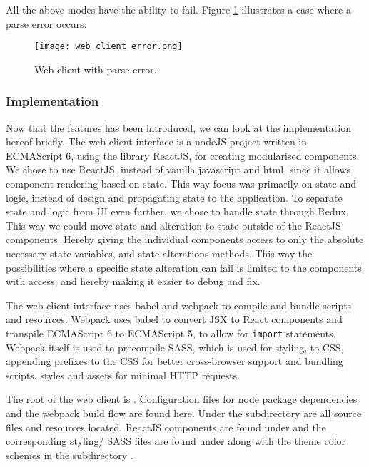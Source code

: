 All the above modes have the ability to fail. Figure \ref{fig:web_client_error} illustrates a case where a parse error occurs.

\begin{figure}
  \texttt{[image: web\_client\_error.png]}
  \caption{Web client with parse error.}
  \label{fig:web_client_error}
\end{figure}


\subsubsection{Implementation}

Now that the features has been introduced, we can look at the implementation hereof briefly.
The web client interface is a nodeJS project written in ECMAScript 6, using the library ReactJS, for creating modularised components.
We chose to use ReactJS, instead of vanilla javascript and html, since it allows component rendering based on state.
This way focus was primarily on state and logic, instead of design and propagating state to the application.
To separate state and logic from UI even further, we chose to handle state through Redux.
This way we could move state and alteration to state outside of the ReactJS components. Hereby giving the individual components access to only the absolute necessary state variables, and state alterations methods.
This way the possibilities where a specific state alteration can fail is limited to the components with access, and hereby making it easier to debug and fix.

The web client interface uses babel and webpack to compile and bundle scripts and resources.
Webpack uses babel to convert JSX to React components and transpile ECMAScript 6 to ECMAScript 5, to allow for \texttt{import} statements.
Webpack itself is used to precompile SASS, which is used for styling, to CSS, appending prefixes to the CSS for better cross-browser support and bundling scripts, styles and assets for minimal HTTP requests.

The root of the web client is . Configuration files for node package dependencies and the webpack build flow are found here.
Under the subdirectory  are all source files and resources located.
ReactJS components are found under  and the corresponding styling/ SASS files are found under  along with the theme color schemes in the subdirectory .

